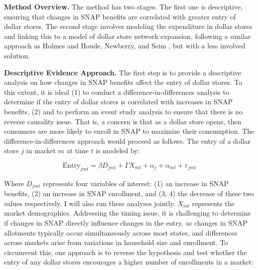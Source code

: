 \documentclass[11pt]{article}
\begin{document}





       
     

\textbf{Method Overview.} The method has two stages. The first one is descriptive, ensuring that changes in SNAP benefits are correlated with greater entry of dollar stores. The second stage involves modeling the expenditure in dollar stores and linking this to a model of dollar store network expansion, following a similar approach as Holmes \citeyear{holmes2011diffusion} and Houde, Newberry, and Seim \citeyear{houde2023nexus}, but with a less involved solution.

\textbf{Descriptive Evidence Approach.} The first step is to provide a descriptive analysis on how changes in SNAP benefits affect the entry of dollar stores. To this extent, it is ideal (1) to conduct a difference-in-differences analysis to determine if the entry of dollar stores is correlated with increases in SNAP benefits, (2) and to perform an event study analysis to ensure that there is no reverse causality issue. That is, a concern is that as a dollar store opens, then consumers are more likely to enroll in SNAP to maximize their consumption. The difference-in-differences approach would proceed as follows. The entry of a dollar store $j$ in market $m$ at time $t$ is modeled by:

\[\text{Entry}_{jmt} =  \beta D_{jmt} +  \Gamma X_{mt} + \alpha_{j} + \alpha_{mt} + \varepsilon_{jmt}\]

Where $D_{jmt}$ represents four variables of interest: (1) an increase in SNAP benefits, (2) an increase in SNAP enrollment, and (3, 4) the decrease of these two values respectively. I will also run these analyses jointly. $X_{mt}$ represents the market demographics. Addressing the timing issue, it is challenging to determine if changes in SNAP directly influence changes in the entry, as changes in SNAP allotments typically occur simultaneously across most states, and differences across markets arise from variations in household size and enrollment. To circumvent this, one approach is to reverse the hypothesis and test whether the entry of any dollar stores encourages a higher number of enrollments in a market:
\end{document}

